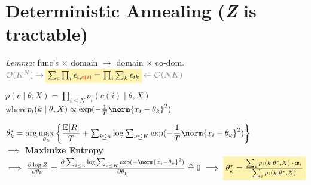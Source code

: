 \section{Deterministic Annealing
\hfill\normalfont\sffamily (\textit{\rmfamily Z} is tractable)}

\emph{Lemma:}\enspace
func's $\times$ domain $\to$ domain $\times$ co-dom.\\
\quad $\textcolor{gray}{\mathcal O(K^N) \rightarrow\,}
\highlight{\sum_c \prod_i \epsilon_{i, \color{red} c(i)} = \prod_i \sum_k \epsilon_{ik}}
\textcolor{gray}{\,\leftarrow \mathcal O(NK)}$

$p(c\mid \theta, X) = \prod_{i\leq N} p_i(c(i) \mid \theta,X)$\\
\quad where\enskip $p_i(k\mid \theta, X) \propto \exp(-\frac1T \norm{x_i - \theta_k}^2)$

$\theta_k^*=\arg\underset{{\theta_k}}\max\left\{\dfrac{\mathbb{E}[R]}{T}+\sum_{i\leq n} \log\sum_{\nu\leq K}\exp(-\dfrac{1}{T}\norm{x_i-\theta_{\nu}}^2)\right\}$\\
$\implies$ \textbf{Maximize Entropy}\\
$\implies \pderiv{\log Z}{{\theta_k}} = \pderiv{\sum_{i\leq n} \log\sum_{\nu\leq K}\exp(-\norm{x_i-\theta_{\nu}}^2)}{\theta_k} \triangleq0
\implies \highlight{\theta_k^\ast = \frac{ \sum_i p_i(k\mid \theta^\ast, X) \:\cdot\: \bm x_i }{ \sum_i p_i(k\mid \theta^\ast, X) }}$


